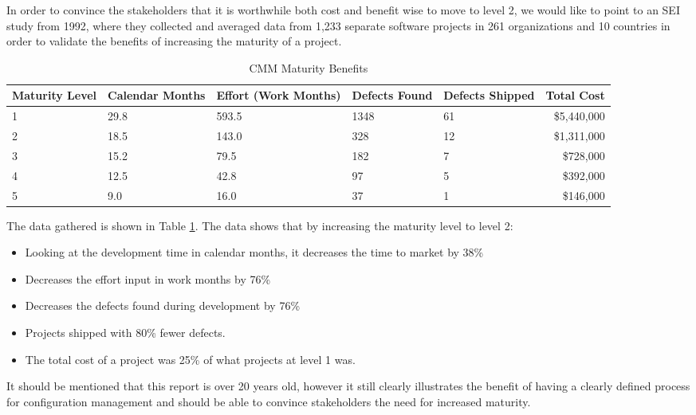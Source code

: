 \documentclass[10pt]{article}
\begin{document}
\noindent In order to convince the stakeholders that it is worthwhile both cost and benefit wise to move to level 2, we would like to point to an SEI study \cite{Merant} from 1992, where they collected and averaged data from 1,233 separate software projects in 261 organizations and 10 countries in order to validate the benefits of increasing the maturity of a project.
\\

\begin{table}[h!]
    \centering
        \begin{tabular}{| p{2cm} | p{2cm} | p{2cm} | l | l | r |}
         \hline
        Maturity Level & Calendar Months & Effort (Work Months) & Defects Found & Defects Shipped & Total Cost \\ \hline
        1 & 29.8 & 593.5 & 1348 & 61 & \$5,440,000 \\ \hline
        2 & 18.5 & 143.0 & 328 & 12 & \$1,311,000 \\ \hline
        3 & 15.2 & 79.5 & 182 & 7 & \$728,000 \\ \hline
        4 & 12.5 & 42.8 & 97 & 5 & \$392,000 \\ \hline
        5 & 9.0 & 16.0 & 37 & 1 & \$146,000 \\ \hline
    \end{tabular}
    \caption{CMM Maturity Benefits}
    \label{table:CMM}
\end{table}

\noindent The data gathered is shown in Table \ref{table:CMM}. The data shows that by increasing the maturity level to level 2:
\begin{itemize}
\item Looking at the development time in calendar months, it decreases the time to market by 38\%
\item Decreases the effort input in work months by 76\%
\item Decreases the defects found during development by 76\%
\item Projects shipped with 80\% fewer defects.
\item The total cost of a project was 25\% of what projects at level 1 was. \\
\end{itemize} 

\noindent It should be mentioned that this report is over 20 years old, however it still clearly illustrates the benefit of having a clearly defined process for configuration management and should be able to convince stakeholders the need for increased maturity.
\end{document}

